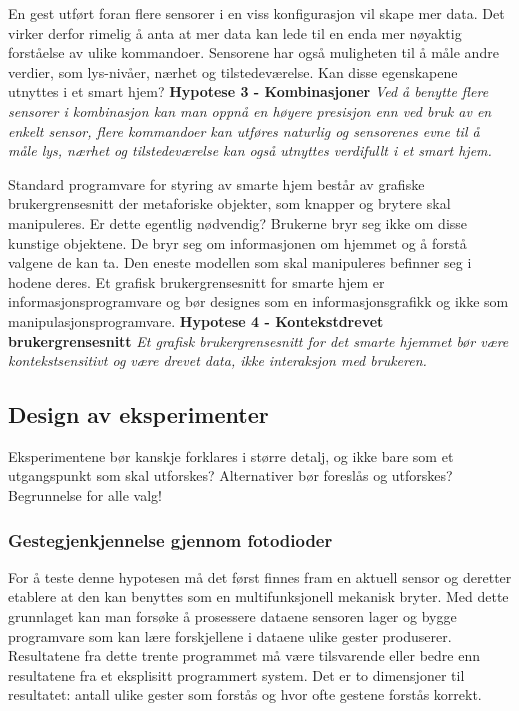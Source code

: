 En gest utført foran flere sensorer i en viss konfigurasjon vil skape mer data. Det virker derfor rimelig å anta at mer data kan lede til en enda mer nøyaktig forståelse av ulike kommandoer. Sensorene har også muligheten til å måle andre verdier, som lys-nivåer, nærhet og tilstedeværelse. Kan disse egenskapene utnyttes i et smart hjem?\newline\newline
\textbf{Hypotese 3 - Kombinasjoner}\newline
\emph{Ved å benytte flere sensorer i kombinasjon kan man oppnå en høyere presisjon enn ved bruk av en enkelt sensor, flere kommandoer kan utføres naturlig og sensorenes evne til å måle lys, nærhet og tilstedeværelse kan også utnyttes verdifullt i et smart hjem.}\newline

Standard programvare for styring av smarte hjem består av  grafiske brukergrensesnitt der metaforiske objekter, som knapper og brytere skal manipuleres. Er dette egentlig nødvendig? Brukerne bryr seg ikke om disse kunstige objektene. De bryr seg om informasjonen om hjemmet og å forstå valgene de kan ta. Den eneste modellen som skal manipuleres befinner seg i hodene deres. Et grafisk brukergrensesnitt for smarte hjem er informasjonsprogramvare og bør designes som en informasjonsgrafikk og ikke som manipulasjonsprogramvare.\newline\newline
\textbf{Hypotese 4 - Kontekstdrevet brukergrensesnitt}\newline
\emph{Et grafisk brukergrensesnitt for det smarte hjemmet bør være kontekstsensitivt og være drevet data, ikke interaksjon med brukeren.}\newline




\subsection{Design av eksperimenter}
{\color{red}Eksperimentene bør kanskje forklares i større detalj, og ikke bare som et utgangspunkt som skal utforskes? Alternativer bør foreslås og utforskes? Begrunnelse for alle valg!}
\subsubsection*{Gestegjenkjennelse gjennom fotodioder}
For å teste denne hypotesen må det først finnes fram en aktuell sensor og deretter etablere at den kan benyttes som en multifunksjonell mekanisk bryter. Med dette grunnlaget kan man forsøke å prosessere dataene sensoren lager og bygge programvare som kan lære forskjellene i dataene ulike gester produserer. Resultatene fra dette trente programmet må være tilsvarende eller bedre enn resultatene fra et eksplisitt programmert system. Det er to dimensjoner til resultatet: antall ulike gester som forstås og hvor ofte gestene forstås korrekt.

